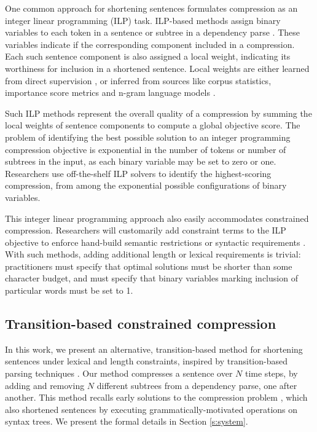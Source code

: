 \documentclass[11pt,a4paper]{article}
\begin{document}
One common approach for shortening sentences formulates compression as an integer linear programming (ILP) task. ILP-based methods assign binary variables to each token in a sentence \cite{clarke2008global} or subtree in a dependency parse \cite{filippova2008dependency}. These variables indicate if the corresponding component included in a compression. Each such sentence component is also assigned a local weight, indicating its worthiness for inclusion in a shortened sentence. Local weights are either learned from direct supervision \cite{filippova2013overcoming,Wang2017CanSH}, or inferred from sources like corpus statistics, importance score metrics and n-gram language models \cite{clarke2008global,filippova2008dependency}.

Such ILP methods represent the overall quality of a compression by summing the local weights of sentence components to compute a global objective score.  The problem of identifying the best possible solution to an integer programming compression objective is exponential in the number of tokens or number of subtrees in the input, as each binary variable may be set to zero or one. Researchers use off-the-shelf ILP solvers to identify the highest-scoring compression, from among the exponential possible configurations of binary variables.

This integer linear programming approach also easily accommodates constrained compression. Researchers will customarily add constraint terms to the ILP objective to enforce hand-build semantic restrictions \cite{clarke2008global} or syntactic requirements \cite{filippova2008dependency}. With such methods, adding additional length or lexical requirements is trivial: practitioners must specify that optimal solutions must be shorter than some character budget, and must specify that binary variables marking inclusion of particular words must be set to 1. 

\subsection{Transition-based constrained compression}

In this work, we present an alternative, transition-based method for shortening sentences under lexical and length constraints, inspired by transition-based parsing techniques \cite{Earley1970AnEC,nivre2003}. Our method compresses a sentence over $N$ time steps, by adding and removing $N$ different subtrees from a dependency parse, one after another. This method recalls early solutions to the compression problem \cite{Jing2000SentenceRF,Knight2000StatisticsBasedS}, which also shortened sentences by executing grammatically-motivated operations on syntax trees. We present the formal details in Section \ref{s:system}. 
\end{document}

